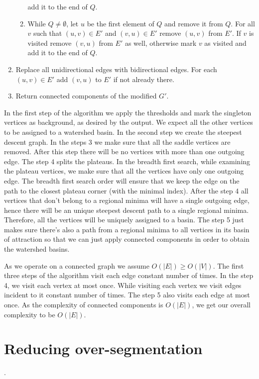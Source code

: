 \documentclass[10pt, conference, compsocconf]{IEEEtran}
\begin{document}
\begin{enumerate}
\begin{enumerate}
    add it to the end of $Q$.
  \item While $Q \neq \emptyset$, let $u$ be the first element of $Q$
    and remove it from $Q$. For all $v$ such that $(u,v) \in E'$ and
    $(v,u) \in E'$ remove $(u,v)$ from $E'$. If $v$ is visited remove
    $(v,u)$ from $E'$ as well, otherwise mark $v$ as visited and add
    it to the end of $Q$.
  \end{enumerate}
\item Replace all unidirectional edges with bidirectional edges. For
  each $(u,v) \in E'$ add $(v,u)$ to $E'$ if not already there.
\item Return connected components of the modified $G'$.
\end{enumerate}

In the first step of the algorithm we apply the thresholds and mark
the singleton vertices as background, as desired by the output. We
expect all the other vertices to be assigned to a watershed basin. In
the second step we create the steepest descent graph. In the steps 3
we make sure that all the saddle vertices are removed. After this step
there will be no vertices with more than one outgoing edge. The step 4
splits the plateaus. In the breadth first search, while examining the
plateau vertices, we make sure that all the vertices have only one
outgoing edge. The breadth first search order will ensure that we keep
the edge on the path to the closest plateau corner (with the minimal
index). After the step 4 all vertices that don't belong to a regional
minima will have a single outgoing edge, hence there will be an unique
steepest descent path to a single regional minima. Therefore, all the
vertices will be uniquely assigned to a basin. The step 5 just makes
sure there's also a path from a regional minima to all vertices in its
basin of attraction so that we can just apply connected components in
order to obtain the watershed basins.

As we operate on a connected graph we assume $O(|E|) \ge O(|V|)$. The
first three steps of the algorithm visit each edge constant number of
times. In the step 4, we visit each vertex at most once. While
visiting each vertex we visit edges incident to it constant number of
times. The step 5 also visits each edge at most once. As the
complexity of connected components is $O(|E|)$, we get our overall
complexity to be $O(|E|)$.

\section{Reducing over-segmentation}.
\end{document}
